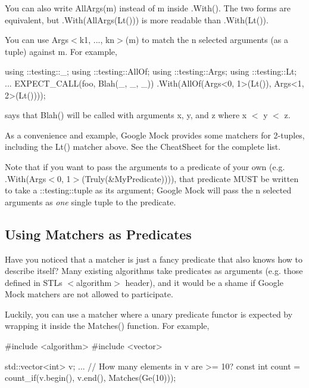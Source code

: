 You can also write {\ttfamily All\+Args(m)} instead of {\ttfamily m} inside {\ttfamily .With()}. The two forms are equivalent, but {\ttfamily .With(All\+Args(\+Lt()))} is more readable than {\ttfamily .With(\+Lt())}.

You can use {\ttfamily Args$<$k1, ..., kn$>$(m)} to match the {\ttfamily n} selected arguments (as a tuple) against {\ttfamily m}. For example,


\begin{DoxyCode}
using ::testing::\_;
using ::testing::AllOf;
using ::testing::Args;
using ::testing::Lt;
...
  EXPECT\_CALL(foo, Blah(\_, \_, \_))
      .With(AllOf(Args<0, 1>(Lt()), Args<1, 2>(Lt())));
\end{DoxyCode}


says that {\ttfamily Blah()} will be called with arguments {\ttfamily x}, {\ttfamily y}, and {\ttfamily z} where {\ttfamily x $<$ y $<$ z}.

As a convenience and example, Google Mock provides some matchers for 2-\/tuples, including the {\ttfamily Lt()} matcher above. See the Cheat\+Sheet for the complete list.

Note that if you want to pass the arguments to a predicate of your own (e.\+g. {\ttfamily .With(Args$<$0, 1$>$(Truly(\&\+My\+Predicate)))}), that predicate M\+U\+ST be written to take a {\ttfamily \+::testing\+::tuple} as its argument; Google Mock will pass the {\ttfamily n} selected arguments as {\itshape one} single tuple to the predicate.

\subsection*{Using Matchers as Predicates}

Have you noticed that a matcher is just a fancy predicate that also knows how to describe itself? Many existing algorithms take predicates as arguments (e.\+g. those defined in S\+TL\textquotesingle{}s {\ttfamily $<$algorithm$>$} header), and it would be a shame if Google Mock matchers are not allowed to participate.

Luckily, you can use a matcher where a unary predicate functor is expected by wrapping it inside the {\ttfamily Matches()} function. For example,


\begin{DoxyCode}
\textcolor{preprocessor}{#include <algorithm>}
\textcolor{preprocessor}{#include <vector>}

std::vector<int> v;
...
\textcolor{comment}{// How many elements in v are >= 10?}
const \textcolor{keywordtype}{int} count = count\_if(v.begin(), v.end(), Matches(Ge(10)));
\end{DoxyCode}


